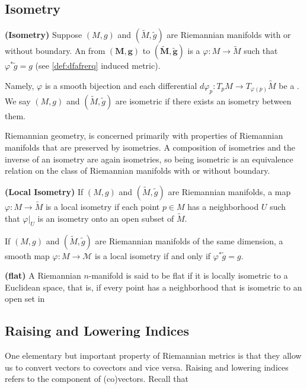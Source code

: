 \documentclass[12pt]{article} %
\newcommand{\bfs}[1]{\textbf{({#1}) }}
\begin{document}
\subsection{Isometry}
\begin{defa}\bfs{Isometry}
Suppose $(M, g)$ and $(\widetilde{M}, \widetilde{g})$ are Riemannian manifolds with or without boundary. An  from $(\boldsymbol{M}, \boldsymbol{g})$ to $(\widetilde{\boldsymbol{M}}, \widetilde{\boldsymbol{g}})$ is a  $\varphi: M \rightarrow \widetilde{M}$ such that $\varphi^{*} \widetilde{g}=g$ (see \cref{def:dfafrerq} {induced metric}). 

Namely, $\varphi$ is a smooth bijection and each differential $d \varphi_{p}: T_{p} M \rightarrow T_{\varphi(p)} \widetilde{M}$ be a . We say $(M, g)$ and $(\widetilde{M}, \widetilde{g})$ are isometric if there exists an isometry between them.
\end{defa}
\begin{rema}
 Riemannian geometry, is concerned primarily with properties of Riemannian manifolds that are preserved by isometries. A composition of isometries and the inverse of an isometry are again isometries, so being isometric is an equivalence relation on the class of Riemannian manifolds with or without boundary. 
\end{rema}
\begin{defa}\bfs{Local Isometry}
If $(M, g)$ and $(\widetilde{M}, \widetilde{g})$ are Riemannian manifolds, a map $\varphi: M \rightarrow \widetilde{M}$ is a local isometry if each point $p \in M$ has a neighborhood $U$ such that $\left.\varphi\right|_{U}$ is an isometry onto an open subset of $\widetilde{M}$.
\end{defa}
\begin{lema}
 If $(M, g)$ and $(\widetilde{M}, \tilde{g})$ are Riemannian manifolds of the same dimension, a smooth map $\varphi: M \rightarrow \mathscr{M}$ is a local isometry if and only if $\varphi^{*} \tilde{g}=g$.
\end{lema}
\begin{defa}\bfs{flat}
A Riemannian $n$-manifold is said to be flat if it is locally isometric to a Euclidean space, that is, if every point has a neighborhood that is isometric to an open set in
\end{defa}

\subsection{Raising and Lowering Indices}
One elementary but important property of Riemannian metrics is that they allow us to convert vectors to covectors and vice versa. Raising and lowering indices refers to the component of (co)vectors. Recall that 
\end{document}
